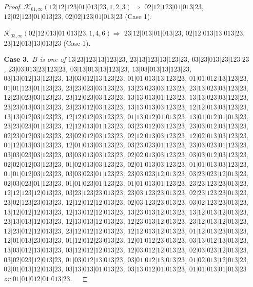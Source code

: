 \documentclass[12pt]{article}
\theoremstyle{plain}
\theoremstyle{definition}
\theoremstyle{remark}
\newcommand{\fancy}[1]{\mathcal{#1}}
\def\K{\fancy{K}}
\newcommand{\case}[2]{{\bf Case #1.}~{\it #2}~~}
\begin{document}
\begin{proof}
	\bigskip
	
	$\K_{01,\infty}(12|12|123|01|013|23,1, 2, 3)\Rightarrow $ $02|12|123|01|013|23$, $12|02|123|01|013|23$, $02|02|123|01|013|23$ (Case 1).
	
	\bigskip
	
	$\K_{03,\infty}(02|12|013|01|013|23,1, 4, 6)\Rightarrow $ $23|12|013|01|013|23$, $02|12|013|13|013|23$, $23|12|013|13|013|23$ (Case 1).
	
	\bigskip
	
	
	\bigskip
	\case{3}{$B$ is one of $13|23|123|13|123|23$, $23|13|123|13|123|23$, $03|23|013|23|123|23$, $23|03|013|23|123|23$, $03|13|013|13|123|23$, $13|03|013|13|123|23$, $03|13|012|13|123|23$, $13|03|012|13|123|23$, $01|01|013|13|123|23$, $01|01|012|13|123|23$, $01|01|123|01|123|23$, $23|23|023|03|123|23$, $13|23|023|03|123|23$, $23|13|023|03|123|23$, $12|23|023|03|123|23$, $23|12|023|03|123|23$, $13|13|013|01|123|23$, $13|13|023|03|123|23$, $23|23|013|03|123|23$, $23|23|012|03|123|23$, $13|13|013|03|123|23$, $12|12|013|03|123|23$, $13|13|012|03|123|23$, $12|12|012|03|123|23$, $01|13|012|01|013|23$, $13|01|012|01|013|23$, $23|23|023|01|123|23$, $12|12|013|01|123|23$, $03|23|012|03|123|23$, $23|03|012|03|123|23$, $02|23|012|03|123|23$, $23|02|012|03|123|23$, $02|12|013|03|123|23$, $12|02|013|03|123|23$, $01|12|013|03|123|23$, $12|01|013|03|123|23$, $03|23|023|01|123|23$, $23|03|023|01|123|23$, $03|03|023|03|123|23$, $03|03|013|03|123|23$, $02|02|013|03|123|23$, $03|03|012|03|123|23$, $02|02|012|03|123|23$, $01|02|013|03|123|23$, $02|01|013|03|123|23$, $01|01|013|03|123|23$, $01|01|012|03|123|23$, $03|03|023|01|123|23$, $23|03|023|12|013|23$, $03|23|023|12|013|23$, $02|03|023|01|123|23$, $01|01|023|01|123|23$, $01|01|013|01|123|23$, $23|23|123|23|013|23$, $12|12|123|12|013|23$, $03|23|123|23|013|23$, $23|03|123|23|013|23$, $02|23|123|23|013|23$, $23|02|123|23|013|23$, $12|12|012|12|013|23$, $02|03|123|23|013|23$, $03|02|123|23|013|23$, $13|12|012|12|013|23$, $12|13|012|12|013|23$, $13|23|013|12|013|23$, $13|12|013|12|013|23$, $23|13|013|12|013|23$, $12|13|013|12|013|23$, $12|23|013|12|013|23$, $23|12|013|12|013|23$, $12|23|012|12|013|23$, $23|12|012|12|013|23$, $12|12|013|12|013|23$, $01|12|013|23|013|23$, $12|01|013|23|013|23$, $01|12|012|23|013|23$, $12|01|012|23|013|23$, $03|13|012|13|013|23$, $13|03|012|13|013|23$, $03|12|012|12|013|23$, $12|03|012|12|013|23$, $02|03|023|12|013|23$, $03|02|023|12|013|23$, $01|03|012|13|013|23$, $03|01|012|13|013|23$, $01|02|013|12|013|23$, $02|01|013|12|013|23$, $03|13|013|01|013|23$, $03|13|012|01|013|23$, $01|01|013|01|013|23$ or $01|01|012|01|013|23$.}
	

\end{proof}
\end{document}
